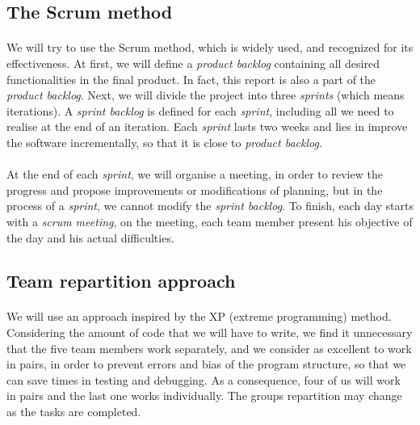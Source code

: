 \documentclass{report}
\begin{document}
\subsection{The Scrum method}

\paragraph{}
\hspace{4mm}\textnormal{We will try to use the Scrum method, which is widely used, and recognized for its effectiveness. At first, we will define a \textit{product backlog} containing all desired functionalities in the final product. In fact, this report is also a part of the \textit{product backlog}. 
Next, we will divide the project into three \textit{sprints} (which means iterations). A \textit{sprint backlog} is defined for each \textit{sprint}, including all we need to realise at the end of an iteration. Each \textit{sprint} lasts two weeks and lies in improve the software 
incrementally, so that it is close to \textit{product backlog}.}

\paragraph{}
\hspace{4mm}\textnormal{At the end of each \textit{sprint}, we will organise a meeting, in order to review the progress and propose improvements or modifications of planning,
 but in the process of a \textit{sprint}, we cannot modify the \textit{sprint backlog}. 
To finish, each day starts with a \textit{scrum meeting}, on the meeting, each 
team member present his objective of the day and his actual difficulties.}

\subsection{Team repartition approach}

\paragraph{}
\hspace{4mm}\textnormal{We will use an approach inspired by the XP (extreme programming) method. 
Considering the amount of code that we will have to write, we find it unnecessary that the five team members work separately, 
and we consider as excellent to work in pairs, in order to prevent errors and bias 
of the program structure, so that we can save times in testing and debugging. 
As a consequence, four of us will work in pairs and the last one works individually. The groups repartition
may change as the tasks are completed.}
\end{document}
